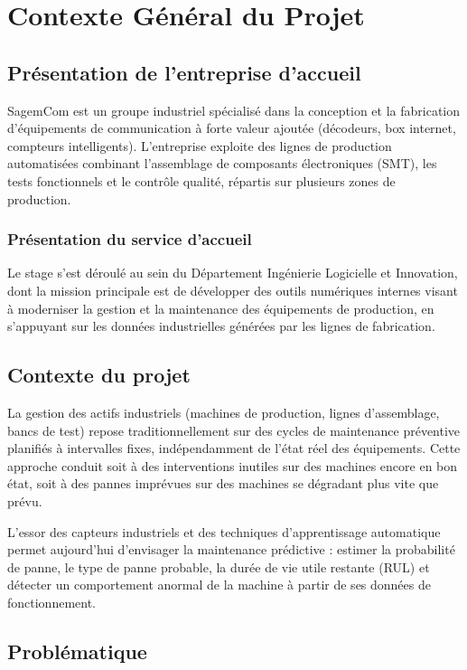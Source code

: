 \chapter{Contexte Général du Projet}

\section{Présentation de l'entreprise d'accueil}

SagemCom est un groupe industriel spécialisé dans la conception et la fabrication d'équipements de communication à forte valeur ajoutée (décodeurs, box internet, compteurs intelligents). L'entreprise exploite des lignes de production automatisées combinant l'assemblage de composants électroniques (SMT), les tests fonctionnels et le contrôle qualité, répartis sur plusieurs zones de production.

\subsection{Présentation du service d'accueil}

Le stage s'est déroulé au sein du Département Ingénierie Logicielle et Innovation, dont la mission principale est de développer des outils numériques internes visant à moderniser la gestion et la maintenance des équipements de production, en s'appuyant sur les données industrielles générées par les lignes de fabrication.

\section{Contexte du projet}

La gestion des actifs industriels (machines de production, lignes d'assemblage, bancs de test) repose traditionnellement sur des cycles de maintenance préventive planifiés à intervalles fixes, indépendamment de l'état réel des équipements. Cette approche conduit soit à des interventions inutiles sur des machines encore en bon état, soit à des pannes imprévues sur des machines se dégradant plus vite que prévu.

L'essor des capteurs industriels et des techniques d'apprentissage automatique permet aujourd'hui d'envisager la maintenance prédictive : estimer la probabilité de panne, le type de panne probable, la durée de vie utile restante (RUL) et détecter un comportement anormal de la machine à partir de ses données de fonctionnement.

\section{Problématique}

